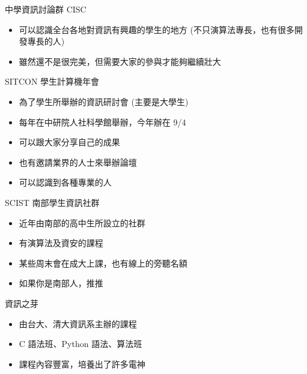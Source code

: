 \documentclass[aspectratio=169]{beamer}
\begin{document}
	\begin{frame}{中學資訊討論群 CISC}
		\begin{itemize}
			\item 可以認識全台各地對資訊有興趣的學生的地方 (不只演算法專長，也有很多開發專長的人)
			\item 雖然還不是很完美，但需要大家的參與才能夠繼續壯大
		\end{itemize}
	\end{frame}

	\begin{frame}{SITCON 學生計算機年會}
		\begin{itemize}
			\item 為了學生所舉辦的資訊研討會 (主要是大學生)
			\item 每年在中研院人社科學館舉辦，今年辦在 9/4
			\item 可以跟大家分享自己的成果
			\item 也有邀請業界的人士來舉辦論壇
			\item 可以認識到各種專業的人 
		\end{itemize}
	\end{frame}

	\begin{frame}{SCIST 南部學生資訊社群}
		\begin{itemize}
			\item 近年由南部的高中生所設立的社群
			\item 有演算法及資安的課程
			\item 某些周末會在成大上課，也有線上的旁聽名額
			\item 如果你是南部人，推推
		\end{itemize}
	\end{frame}

	\begin{frame}{資訊之芽}
		\begin{itemize}
			\item 由台大、清大資訊系主辦的課程
			\item C 語法班、Python 語法、算法班
			\item 課程內容豐富，培養出了許多電神
		\end{itemize}
	\end{frame}
\end{document}
